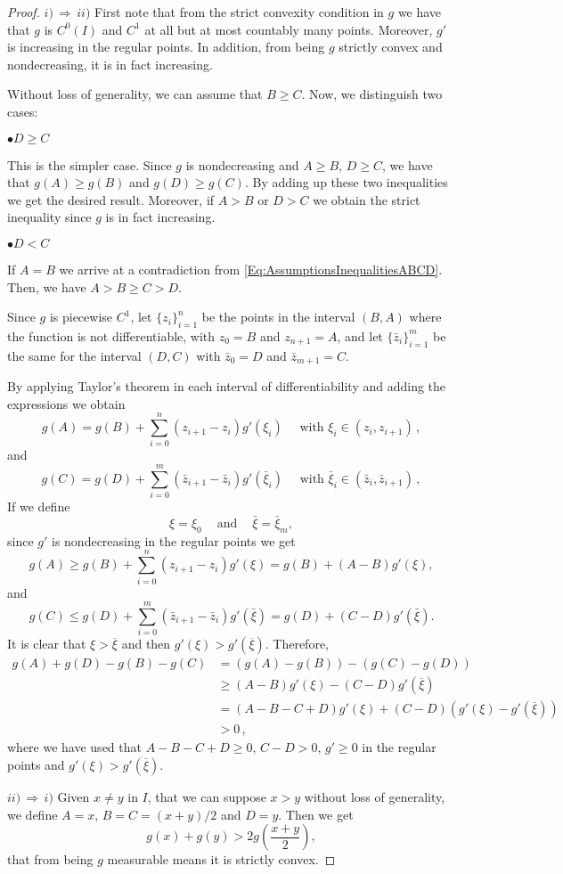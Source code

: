 \begin{proof}
$i)\, \Rightarrow \,ii)$ First note that from the strict convexity condition in $g$ we have that
$g$ is $C^0(I)$ and $C^1$ at all but at most countably many points. Moreover, $g'$ is increasing in
the regular points. In addition, from being $g$ strictly convex and nondecreasing, it is in fact
increasing.

Without loss of generality, we can assume that $B \geq C$. Now, we distinguish two cases:

$\bullet D \geq C$

This is the simpler case. Since $g$ is nondecreasing and $A \geq B$, $D \geq C$, we have that $g(A)
\geq g(B)$ and $g(D) \geq g(C)$. By adding up these two inequalities we get the desired result.
Moreover, if $A>B$ or $D>C$ we obtain the strict inequality since $g$ is in fact increasing.

$\bullet D < C$

If $A = B$ we arrive at a contradiction from \eqref{Eq:AssumptionsInequalitiesABCD}. Then, we have
$A > B \geq C > D$.

Since $g$ is piecewise $C^1$, let $\{z_i\}_{i=1}^{n}$ be the points in the interval $(B,A)$ where
the function is not differentiable, with $z_0 = B$ and $z_{n+1}=A$, and let
$\{\bar{z}_i\}_{i=1}^{m}$ be the same for the interval $(D,C)$ with $\bar{z}_0 = D$ and
$\bar{z}_{m+1}=C$.

By applying Taylor's theorem in each interval of differentiability and adding the expressions we
obtain
$$
g(A) = g(B) + \sum_{i=0}^{n}(z_{i+1}-z_i) g'(\xi_i) \quad \textrm{ with } \xi_i \in (z_i,z_{i+1})\,,
$$
and
$$
g(C) = g(D) + \sum_{i=0}^{m}(\bar{z}_{i+1}-\bar{z}_i) g'(\bar{\xi}_i) \quad \textrm{ with } \bar{\xi}_i \in (\bar{z}_i,\bar{z}_{i+1})\,,
$$
If we define
$$ \xi = \xi_0 \ \ \ \ \textrm{ and } \ \ \ \ \bar{\xi} = \bar{\xi}_m
,$$
since $g'$ is nondecreasing in the regular points we get
$$
g(A) \geq g(B) + \sum_{i=0}^{n}(z_{i+1}-z_i) g'(\xi) = g(B) + (A-B)g'(\xi),
$$
and
$$
g(C) \leq g(D) + \sum_{i=0}^{m}(\bar{z}_{i+1}-\bar{z}_i) g'(\bar{\xi}) = g(D)+(C-D)g'(\bar{\xi}).
$$
It is clear that $\xi > \overline{\xi}$ and then $g'(\xi) > g'(\overline{\xi})$. Therefore,
\begin{align*}
g(A) + g(D) - g(B) - g(C) &= (g(A) - g(B)) - (g(C) - g(D)) \\
&\geq (A - B)g'(\xi)  - (C - D)g'(\overline{\xi}) \\
&= (A - B - C + D)g'(\xi) + (C - D) (g'(\xi) - g'(\overline{\xi}))\\
& > 0\,,
\end{align*}
where we have used that $A - B - C + D \geq 0$, $C - D > 0$, $g'\geq 0$ in the regular points and
$g'(\xi) > g'(\overline{\xi})$.

$ii)\, \Rightarrow \,i)$ Given $x\neq y$ in $I$, that we can suppose $x>y$ without loss of
generality, we define $A=x$, $B=C=(x+y)/2$ and $D=y$. Then we get
$$ g(x)+g(y) > 2g\left( \frac{x+y}{2} \right), $$
that from being $g$ measurable means it is strictly convex.
\end{proof}


